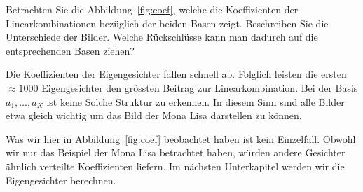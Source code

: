 \begin{aufgabe}
	Betrachten Sie die Abbildung~\ref{fig:coef}, welche die Koeffizienten der Linearkombinationen bezüglich der beiden Basen zeigt.
	Beschreiben Sie die Unterschiede der Bilder.
	Welche Rückschlüsse kann man dadurch auf die entsprechenden Basen ziehen?
\end{aufgabe}
\begin{losung*}
	Die Koeffizienten der Eigengesichter fallen schnell ab.
	Folglich leisten die ersten $\approx 1000$ Eigengesichter den grössten Beitrag zur Linearkombination.
	Bei der Basis $a_1,\ldots,a_K$ ist keine Solche Struktur zu erkennen.
	In diesem Sinn sind alle Bilder etwa gleich wichtig um das Bild der Mona Lisa darstellen zu können.
\end{losung*}
Was wir hier in Abbildung~\ref{fig:coef} beobachtet haben ist kein Einzelfall.
Obwohl wir nur das Beispiel der Mona Lisa betrachtet haben, würden andere Gesichter ähnlich verteilte Koeffizienten liefern.
Im nächsten Unterkapitel werden wir die Eigengesichter berechnen.
